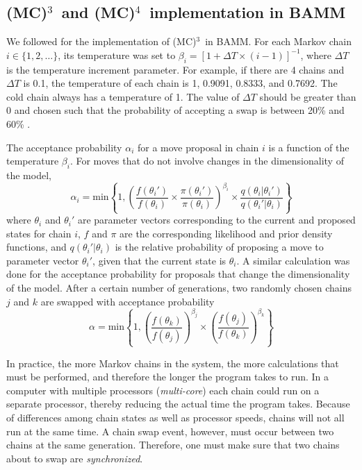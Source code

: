 \documentclass[12pt]{article}
\newcommand{\MCMCMC}{(MC)$^{3}$}
\newcommand{\MCMCMCMC}{(MC)$^{4}$}
\begin{document}
\subsection*{\MCMCMC\ and \MCMCMCMC\ implementation in BAMM}

We followed \citet{alt04} for the implementation of \MCMCMC\ in BAMM.
%
For each Markov chain $i \in \{1, 2, \dots\}$, its temperature was set to
$\beta_i = [1 + \Delta T \times (i - 1)]^{-1}$,
where $\Delta T$ is the temperature increment parameter.
%
For example, if there are 4 chains and $\Delta T$ is 0.1,
the temperature of each chain is 1, 0.9091, 0.8333, and 0.7692.
%
The cold chain always has a temperature of 1.
%
The value of $\Delta T$ should be greater than 0
and chosen such that the probability of accepting a swap
is between 20\% and 60\% \citep{alt04}.


The acceptance probability $\alpha_i$ for a move proposal in chain $i$
is a function of the temperature $\beta_i$.
%
For moves that do not involve changes in the dimensionality of the model,
\[\alpha_i = \text{min}\left\{ 1,
    \left(
    \frac{f(\theta_i')}{f(\theta_i)} \times
    \frac{\pi(\theta_i')}{\pi(\theta_i)}
    \right)^{\beta_i} \times
    \frac{q(\theta_i | \theta_i')}{q(\theta_i' | \theta_i)}
\right\}\]
where $\theta_i$ and $\theta_i'$ are parameter vectors
corresponding to the current and proposed states for chain $i$,
$f$ and $\pi$ are the corresponding likelihood and prior density functions,
and $q(\theta_i' | \theta_i)$ is the relative probability
of proposing a move to parameter vector $\theta_i'$,
given that the current state is $\theta_i$.
%
A similar calculation was done for the acceptance probability for proposals
that change the dimensionality of the model.
%
After a certain number of generations, two randomly chosen chains $j$ and $k$
are swapped with acceptance probability
\[\alpha = \text{min}\left\{ 1,
    \left(\frac{f(\theta_k)}{f(\theta_j)}\right)^{\beta_j} \times
    \left(\frac{f(\theta_j)}{f(\theta_k)}\right)^{\beta_k}
\right\}\]


In practice, the more Markov chains in the system,
the more calculations that must be performed,
and therefore the longer the program takes to run.
%
In a computer with multiple processors (\emph{multi-core})
each chain could run on a separate processor,
thereby reducing the actual time the program takes.
%
Because of differences among chain states as well as processor speeds,
chains will not all run at the same time.
%
A chain swap event, however, must occur between two chains
at the same generation.
%
Therefore, one must make sure that two chains about to swap
are \emph{synchronized}.
\end{document}
